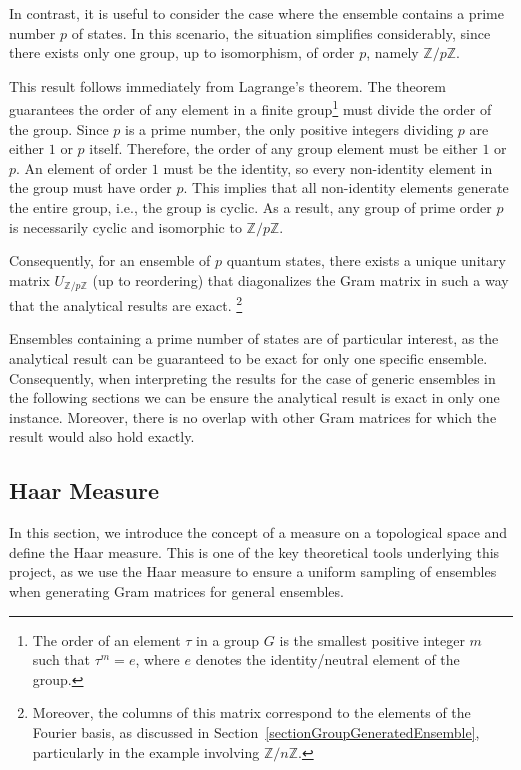 \documentclass[12pt,letterpaper]{article}
\begin{document}
In contrast, it is useful to consider the case where the ensemble contains a prime number $p$ of states. In this scenario, the situation simplifies considerably, since there exists only one group, up to isomorphism, of order $p$, namely $\mathbb{Z}/p\mathbb{Z}$.

This result follows immediately from Lagrange's theorem\cite{LagrangeTheoreme}. The theorem guarantees the order of any element in a finite group\footnote{The order of an element $\tau$ in a group $G$ is the smallest positive integer $m$ such that $\tau^m = e$, where $e$ denotes the identity/neutral element of the group.} must divide the order of the group. Since $p$ is a prime number, the only positive integers dividing $p$ are either $1$ or $p$ itself. Therefore, the order of any group element must be either $1$ or $p$. An element of order $1$ must be the identity, so every non-identity element in the group must have order $p$. This implies that all non-identity elements generate the entire group, i.e., the group is cyclic. As a result, any group of prime order $p$ is necessarily cyclic and isomorphic to $\mathbb{Z}/p\mathbb{Z}$.

Consequently, for an ensemble of $p$ quantum states, there exists a unique unitary matrix $U_{\mathbb{Z}/p\mathbb{Z}}$ (up to reordering) that diagonalizes the Gram matrix in such a way that the analytical results are exact. \footnote{Moreover, the columns of this matrix correspond to the elements of the Fourier basis, as discussed in Section~\ref{sectionGroupGeneratedEnsemble}, particularly in the example involving $\mathbb{Z}/n\mathbb{Z}$.}

Ensembles containing a prime number of states are of particular interest, as the analytical result can be guaranteed to be exact for only one specific ensemble. Consequently, when interpreting the results for the case of generic ensembles in the following sections we can be ensure the analytical result is exact in only one instance. Moreover, there is no overlap with other Gram matrices for which the result would also hold exactly.

\subsection{Haar Measure}
\hspace{20pt}In this section, we introduce the concept of a measure on a topological space and define the Haar measure. This is one of the key theoretical tools underlying this project, as we use the Haar measure to ensure a uniform sampling of ensembles when generating Gram matrices for general ensembles.
\end{document}
